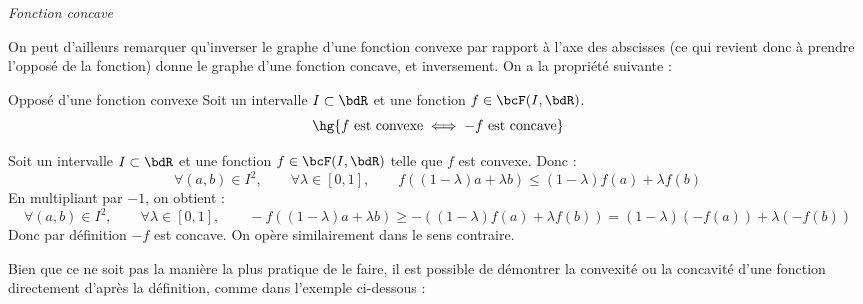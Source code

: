 \documentclass[a4paper,french,bookmarks]{report}
\begin{document}
\begin{center}
\begin{minipage}{0.35\linewidth}
        
        \textit{\color{main1}\EBGaramond Fonction concave}
    \end{minipage}
\end{center}


On peut d'ailleurs remarquer qu'inverser le graphe d'une fonction convexe par rapport à l'axe des abscisses (ce qui revient donc à prendre l'opposé de la fonction) donne le graphe d'une fonction concave, et inversement. On a la propriété suivante :

\begin{property}{Opposé d'une fonction convexe}{}
    Soit un intervalle $I \subset \bdR$ et une fonction $f \in \bcF(I, \bdR)$. 
    \[ \hg{f \ \text{est convexe} \iff -f \ \text{est concave}}\]
\end{property}

\begin{nproof}
    Soit un intervalle $I \subset \bdR$ et une fonction $f \in \bcF(I, \bdR)$ telle que $f$ est convexe. Donc :
    \[ \forall (a, b) \in I^2,\qquad \forall \lambda \in [0, 1],\qquad f\left((1-\lambda)a + \lambda b\right) \leq (1-\lambda)f(a) + \lambda f(b)\]
    En multipliant par $-1$, on obtient :
    \[ \forall (a, b) \in I^2,\qquad \forall \lambda \in [0, 1],\qquad -f\left((1-\lambda)a + \lambda b\right) \geq -\left((1-\lambda)f(a) + \lambda f(b)\right) = (1-\lambda)\left(-f(a)\right) +\lambda\left(-f(b)\right)\]
    Donc par définition $-f$ est concave. On opère similairement dans le sens contraire.
\end{nproof}

Bien que ce ne soit pas la manière la plus pratique de le faire, il est possible de démontrer la convexité ou la concavité d'une fonction directement d'après la définition, comme dans l'exemple ci-dessous :
\end{document}

